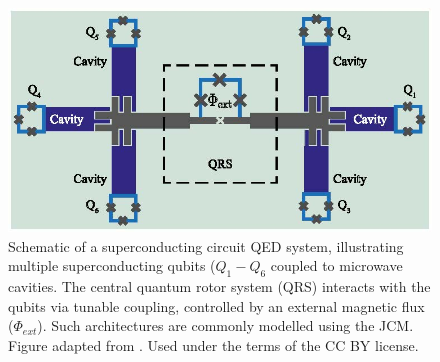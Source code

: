 \documentclass[12pt,a4paper]{article}
\begin{document}
\begin{figure}[h]
    \centering
    \includegraphics[scale=1.5]{circuit_QED}
    \caption{Schematic of a superconducting circuit QED system, illustrating multiple superconducting qubits ($Q_1-Q_6$ coupled to microwave cavities. The central quantum rotor system (QRS) interacts with the qubits via tunable coupling, controlled by an external magnetic flux ($\Phi_{ext}$). Such architectures are commonly modelled using the JCM. Figure adapted from \cite{Image-CircuitQED}. Used under the terms of the CC BY license.}
    \label{fig:circuitQED}
\end{figure}
\end{document}
